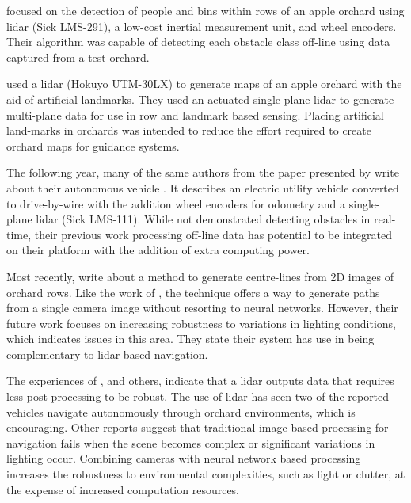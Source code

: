 \documentclass[preprint,authoryear,12pt]{elsarticle}
\begin{document}
        \cite{Freitas2012} focused on the detection of people and bins within rows of an apple orchard using lidar (Sick LMS-291), a low-cost inertial measurement unit, and wheel encoders.
        Their algorithm was capable of detecting each obstacle class off-line using data captured from a test orchard.

        \cite{Zhang2014} used a lidar (Hokuyo UTM-30LX) to generate maps of an apple orchard with the aid of artificial landmarks.
        They used an actuated single-plane lidar to generate multi-plane data for use in row and landmark based sensing.
        Placing artificial land-marks in orchards was intended to reduce the effort required to create orchard maps for guidance systems.

        The following year, many of the same authors from  the paper presented by \cite{Zhang2014} write about their autonomous vehicle \citep{Bergerman2015}.
        It describes an electric utility vehicle converted to drive-by-wire with the addition wheel encoders for odometry and a single-plane lidar (Sick LMS-111).
        While not demonstrated detecting obstacles in real-time, their previous work processing off-line data \citep{Freitas2012} has potential to be integrated on their platform with the addition of extra computing power.

        Most recently, \cite{Sharifi2015} write about a method to generate centre-lines from 2D images of orchard rows.
        Like the work of \cite{He2011}, the technique offers a way to generate paths from a single camera image without resorting to neural networks.
        However, their future work focuses on increasing robustness to variations in lighting conditions, which indicates issues in this area.
        They state their system has use in being complementary to lidar based navigation.

        The experiences of \cite{Scarfe2012}, and others, indicate that a lidar outputs data that requires less post-processing to be robust.
        The use of lidar has seen two of the reported vehicles navigate autonomously through orchard environments, which is encouraging.
        Other reports suggest that traditional image based processing for navigation fails when the scene becomes complex or significant variations in lighting occur.
        Combining cameras with neural network based processing increases the robustness to environmental complexities, such as light or clutter, at the expense of increased computation resources.
\end{document}
